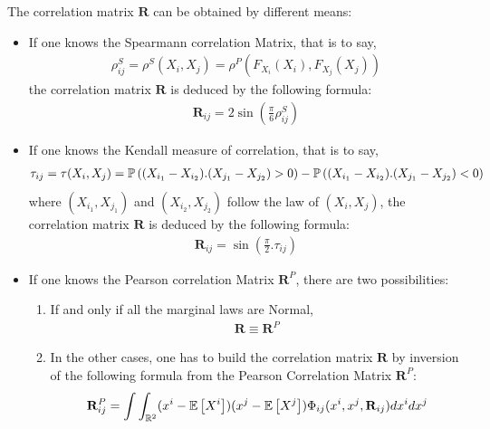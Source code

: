{  The correlation matrix $\mathbf R$ can be obtained by different means:
  \begin{itemize}
  \item If one knows the Spearmann correlation Matrix, that is to say,
    \begin{align*}
      \rho_{ij}^S = \rho^S(X_i,X_j) = \rho^P(F_{X_i}(X_i),F_{X_j}(X_j))
    \end{align*}
    the correlation matrix $\mathbf R$ is deduced by the following formula:
    \begin{align*}
      \mathbf R_{ij} = 2 \sin(\frac{\pi}{6}\rho_{ij}^S)
    \end{align*}
  \item If one knows the Kendall measure of correlation, that is to say,
    \begin{align*}
      \tau_{ij} = \tau(X_i,X_j) = {\mathbb P}\left( (X_{i_1} - X_{i_2}).(X_{j_1} - X_{j_2}) > 0 \right) - {\mathbb P}\left( (X_{i_1} - X_{i_2}).(X_{j_1} - X_{j_2}) < 0 \right)
    \end{align*}
    where $(X_{i_1},X_{j_1})$ and $(X_{i_2},X_{j_2})$ follow the law of $(X_i,X_j)$,
    the correlation matrix $\mathbf R$ is deduced by the following formula:
    \begin{align*}
      \mathbf R_{ij} = \sin(\frac{\pi}{2} . \tau_{ij})
    \end{align*}
  \item If one knows the Pearson correlation Matrix $\mathbf R^P$, there are two possibilities:
    \begin{enumerate}
    \item       If and only if all the marginal laws are Normal,
      \begin{align*}
        \mathbf R \equiv \mathbf R^P
      \end{align*}
    \item
      In the other cases, one has to build the correlation matrix $\mathbf R$ by inversion of the following formula from the Pearson Correlation Matrix $\mathbf R^P$:
      \begin{align*}
        \mathbf R_{ij}^P = \int \int_{{\mathbb R}^2} (x^i-{\mathbb E}\left[ X^i \right])(x^j-{\mathbb E}\left[ X^j \right]) \Phi_{ij}(x^i,x^j,\mathbf R_{ij})dx^i dx^j
      \end{align*}
    \end{enumerate}
  \end{itemize}




}
